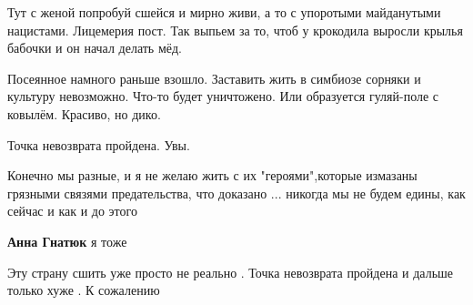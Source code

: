 \begin{itemize}

Тут с женой попробуй сшейся и мирно живи, а то с упоротыми майданутыми
нацистами. Лицемерия пост. Так выпьем за то, чтоб у крокодила выросли крылья
бабочки и он начал делать мёд.

 

Посеянное намного раньше взошло. Заставить жить в симбиозе сорняки и культуру
невозможно. Что-то будет уничтожено. Или образуется гуляй-поле с ковылём.
Красиво, но дико.


 
Точка невозврата пройдена. Увы.

 

Конечно мы разные, и я не желаю жить с их "героями",которые измазаны грязными
связями предательства, что доказано ... никогда мы не будем едины, как сейчас и
как и до этого

\begin{itemize}
 
\textbf{Анна Гнатюк} я тоже
\end{itemize}

 
Эту страну сшить уже просто не реально . Точка невозврата пройдена и дальше только хуже . К сожалению 🤔


\end{itemize}
